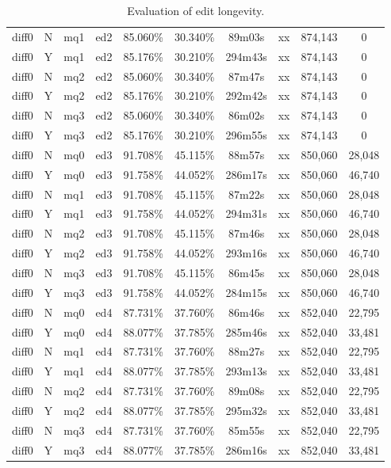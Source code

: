\begin{sidewaystable}[!tp]
\begin{center}
\begin{tabular}{|c|c|c|c||c|c||c|c|c|c|}
diff0 & N & mq1 & ed2
	& 85.060\% & 30.340\%
	& 89m03s & xx
	& 874,143 & 0 \\
diff0 & Y & mq1 & ed2
	& 85.176\% & 30.210\%
	& 294m43s & xx
	& 874,143 & 0 \\
diff0 & N & mq2 & ed2
	& 85.060\% & 30.340\%
	& 87m47s & xx
	& 874,143 & 0 \\
diff0 & Y & mq2 & ed2
	& 85.176\% & 30.210\%
	& 292m42s & xx
	& 874,143 & 0 \\
diff0 & N & mq3 & ed2
	& 85.060\% & 30.340\%
	& 86m02s & xx
	& 874,143 & 0 \\
diff0 & Y & mq3 & ed2
	& 85.176\% & 30.210\%
	& 296m55s & xx
	& 874,143 & 0 \\
diff0 & N & mq0 & ed3
	& 91.708\% & 45.115\%
	& 88m57s & xx
	& 850,060 & 28,048 \\
diff0 & Y & mq0 & ed3
	& 91.758\% & 44.052\%
	& 286m17s & xx
	& 850,060 & 46,740 \\
diff0 & N & mq1 & ed3
	& 91.708\% & 45.115\%
	& 87m22s & xx
	& 850,060 & 28,048 \\
diff0 & Y & mq1 & ed3
	& 91.758\% & 44.052\%
	& 294m31s & xx
	& 850,060 & 46,740 \\
diff0 & N & mq2 & ed3
	& 91.708\% & 45.115\%
	& 87m46s & xx
	& 850,060 & 28,048 \\
diff0 & Y & mq2 & ed3
	& 91.758\% & 44.052\%
	& 293m16s & xx
	& 850,060 & 46,740 \\
diff0 & N & mq3 & ed3
	& 91.708\% & 45.115\%
	& 86m45s & xx
	& 850,060 & 28,048 \\
diff0 & Y & mq3 & ed3
	& 91.758\% & 44.052\%
	& 284m15s & xx
	& 850,060 & 46,740 \\
diff0 & N & mq0 & ed4
	& 87.731\% & 37.760\%
	& 86m46s & xx
	& 852,040 & 22,795 \\
diff0 & Y & mq0 & ed4
	& 88.077\% & 37.785\%
	& 285m46s & xx
	& 852,040 & 33,481 \\
diff0 & N & mq1 & ed4
	& 87.731\% & 37.760\%
	& 88m27s & xx
	& 852,040 & 22,795 \\
diff0 & Y & mq1 & ed4
	& 88.077\% & 37.785\%
	& 293m13s & xx
	& 852,040 & 33,481 \\
diff0 & N & mq2 & ed4
	& 87.731\% & 37.760\%
	& 89m08s & xx
	& 852,040 & 22,795 \\
diff0 & Y & mq2 & ed4
	& 88.077\% & 37.785\%
	& 295m32s & xx
	& 852,040 & 33,481 \\
diff0 & N & mq3 & ed4
	& 87.731\% & 37.760\%
	& 85m55s & xx
	& 852,040 & 22,795 \\
diff0 & Y & mq3 & ed4
	& 88.077\% & 37.785\%
	& 286m16s & xx
	& 852,040 & 33,481 \\
\hline
    \end{tabular}
  \end{center}
  \caption{Evaluation of edit longevity.}
\end{sidewaystable}

